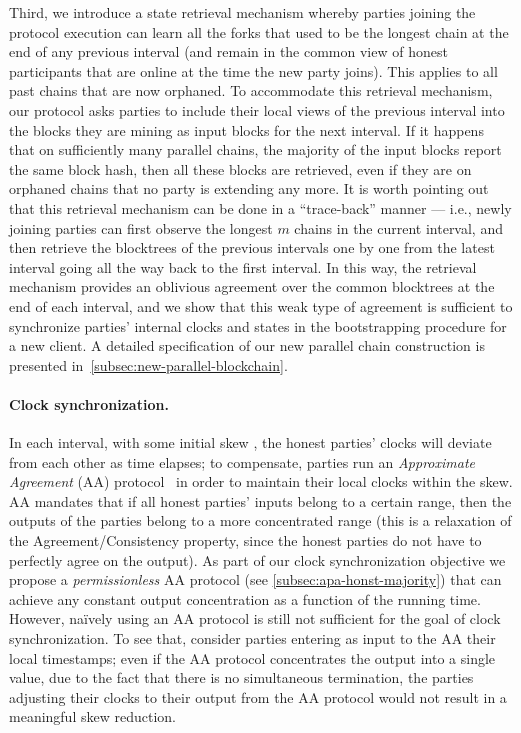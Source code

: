 Third, we introduce a state retrieval mechanism whereby parties joining the protocol execution can learn all the forks that used to be the longest chain at the end of any previous interval (and remain in the common view of honest participants that are online at the time the new party joins).
%
This applies to all past chains that are now orphaned.
%
To accommodate this retrieval mechanism, our protocol asks parties to include their local views of the previous interval into the blocks they are mining as input blocks for the next interval.
%
If it happens that on sufficiently many parallel chains, the majority of the input blocks report the same block hash, then all these blocks are retrieved, even if they are on orphaned chains that no party is extending any more.
%
It is worth pointing out that this retrieval mechanism can be done in a ``trace-back'' manner --- i.e., newly joining parties can first observe the longest $m$ chains in the current interval, and then retrieve the blocktrees of the previous intervals one by one from the latest interval going all the way back to the first interval.
%
In this way, the retrieval mechanism provides an oblivious agreement over the common blocktrees at the end of each interval, and we show that this weak type of agreement is sufficient to synchronize parties' internal clocks and states in the bootstrapping procedure for a new client.
%
A detailed specification of our new parallel chain construction is presented in~\cref{subsec:new-parallel-blockchain}.

\paragraph{Clock synchronization.}
%
In each interval, with some initial skew \initSkew, the honest parties' clocks will deviate from each other as time elapses; to compensate, parties run an \emph{Approximate Agreement} (AA) protocol~\cite{JACM:DLPSW86} in order to maintain their local clocks within the \initSkew skew.
%
AA mandates that if all honest parties' inputs belong to a certain range, then the outputs of the parties belong to a more concentrated range (this is a relaxation of the Agreement/Consistency property, since the honest parties do not have to perfectly agree on the output).
%
As part of our clock synchronization objective we propose a \emph{permissionless} AA protocol (see \cref{subsec:apa-honst-majority}) that can achieve any constant output concentration as a function of the running time.
%
However, na\"ively using an AA protocol is still not sufficient for the goal of clock synchronization.
%
To see that, consider parties entering as input to the AA their local timestamps; even if the AA protocol concentrates the output into a single value, due to the fact that there is no simultaneous termination, the parties adjusting their clocks to their output from the AA protocol would not result in a meaningful skew reduction.

